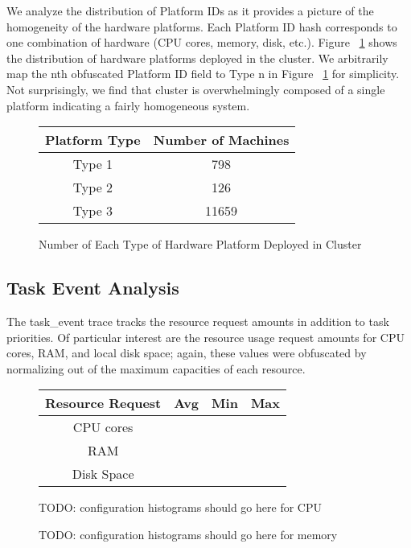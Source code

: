 \documentclass{sig-alternate}
\begin{document}
We analyze the distribution of Platform IDs as it provides a picture of the homogeneity of the hardware platforms.
Each Platform ID hash corresponds to one combination of hardware (CPU cores, memory, disk, etc.).
Figure ~\ref{platform_dist} shows the distribution of hardware platforms deployed in the cluster.
We arbitrarily map the nth obfuscated Platform ID field to Type n in Figure ~\ref{platform_dist} for simplicity.
Not surprisingly, we find that cluster is overwhelmingly composed of a single platform indicating a fairly homogeneous system.

\begin{figure}
\centering
\begin{tabular}{| c | c |} \hline
Platform Type & Number of Machines\\ \hline
Type 1 & 798\\ \hline
Type 2 & 126\\ \hline
Type 3 & 11659 \\ \hline
\end{tabular}
\label{platform_dist}
\caption{Number of Each Type of Hardware Platform Deployed in Cluster}
\end{figure}

\subsection{Task Event Analysis}

The task\_event trace tracks the resource request amounts in addition to task priorities.
Of particular interest are the resource usage request amounts for CPU cores, RAM, and local disk space; again, these values were obfuscated by normalizing out of the maximum capacities of each resource.

\begin{figure}
\centering
\begin{tabular}{| c | c | c | c |} \hline
Resource Request & Avg & Min & Max \\ \hline
CPU cores & & & \\ \hline
RAM & & & \\ \hline
Disk Space & & & \\ \hline
\end{tabular}
\end{figure}

\begin{figure}
TODO: configuration histograms should go here for CPU
\end{figure}

\begin{figure}
TODO: configuration histograms should go here for memory
\end{figure}
\end{document}
